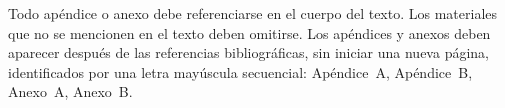 \documentclass[spanish]{rbie2026}%
\begin{document}
Todo apéndice o anexo debe referenciarse en el cuerpo del texto. Los materiales que no se mencionen en el texto deben omitirse. Los apéndices y anexos deben aparecer después de las referencias bibliográficas, sin iniciar una nueva página, identificados por una letra mayúscula secuencial: Apéndice~A, Apéndice~B, Anexo~A, Anexo~B.
\end{document}
